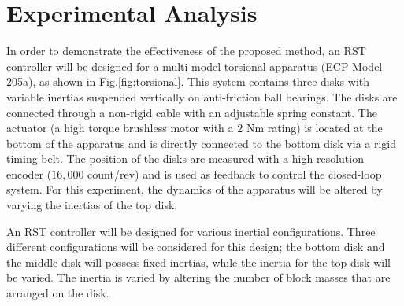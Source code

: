 \documentclass[a4paper, 10pt, conference]{ieeeconf}
\begin{document}
\section{Experimental Analysis}
\label{sec:4}
In order to demonstrate the effectiveness of the proposed method, an RST controller will be designed for a multi-model torsional apparatus (ECP Model 205a), as shown in Fig.\ref{fig:torsional}. This system contains three disks with variable inertias suspended vertically on anti-friction ball bearings. The disks are connected through a non-rigid cable with an adjustable spring constant. The actuator (a high torque brushless motor with a $2$ Nm rating) is located at the bottom of the apparatus and is directly connected to the bottom disk via a rigid timing belt. The position of the disks are measured with a high resolution encoder ($16,000$ count/rev) and is used as feedback to control the closed-loop system. For this experiment, the dynamics of the apparatus will be altered by varying the inertias of the top disk. 

An RST controller will be designed for various inertial configurations. Three different configurations will be considered for this design; the bottom disk and the middle disk will possess fixed inertias, while the inertia for the top disk will be varied. The inertia is varied by altering the number of block masses that are arranged on the disk. 
\end{document}
